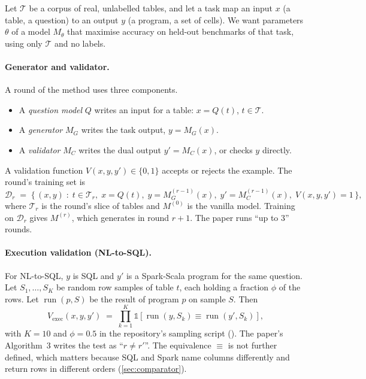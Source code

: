 Let $\mathcal{T}$ be a corpus of real, unlabelled tables, and let a task map an input $x$ (a table, a question) to an
output $y$ (a program, a set of cells). We want parameters $\theta$ of a model $M_\theta$ that maximise accuracy on
held-out benchmarks of that task, using only $\mathcal{T}$ and no labels.

\paragraph{Generator and validator.} A round of the method uses three components.
\begin{itemize}
\item A \emph{question model} $Q$ writes an input for a table: $x = Q(t)$, $t\in\mathcal{T}$.
\item A \emph{generator} $M_G$ writes the task output, $y = M_G(x)$.
\item A \emph{validator} $M_C$ writes the dual output $y' = M_C(x)$, or checks $y$ directly.
\end{itemize}
A validation function $V(x, y, y') \in \{0,1\}$ accepts or rejects the example. The round's training set is
\begin{equation}
  \mathcal{D}_r \;=\; \bigl\{\, (x, y) \;:\; t \in \mathcal{T}_r,\; x = Q(t),\; y = M_G^{(r-1)}(x),\;
  y' = M_C^{(r-1)}(x),\; V(x,y,y') = 1 \,\bigr\},
  \label{eq:dataset}
\end{equation}
where $\mathcal{T}_r$ is the round's slice of tables and $M^{(0)}$ is the vanilla model. Training on $\mathcal{D}_r$
gives $M^{(r)}$, which generates in round $r+1$. The paper runs ``up to 3'' rounds.

\paragraph{Execution validation (NL-to-SQL).} For NL-to-SQL, $y$ is SQL and $y'$ is a Spark-Scala program for the same
question. Let $S_1,\dots,S_K$ be random row samples of table $t$, each holding a fraction $\phi$ of the rows. Let
$\operatorname{run}(p, S)$ be the result of program $p$ on sample $S$. Then
\begin{equation}
  V_{\text{exec}}(x,y,y') \;=\; \prod_{k=1}^{K} \mathbb{1}\!\left[\operatorname{run}(y,S_k) \equiv
  \operatorname{run}(y',S_k)\right],
  \label{eq:vexec}
\end{equation}
with $K=10$ and $\phi=0.5$ in the repository's sampling script (). The paper's Algorithm~3
writes the test as ``$r \neq r'$''. The equivalence $\equiv$ is not further defined, which matters because SQL and
Spark name columns differently and return rows in different orders (\cref{sec:comparator}).

